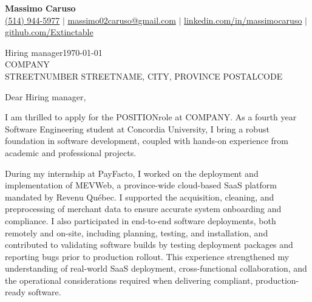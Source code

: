 \documentclass[10pt]{article}
\begin{document}
\newcommand{\fullname}{Massimo Caruso}
\newcommand{\phone}{(514) 944-5977}
\newcommand{\email}{massimo02caruso@gmail.com}
\newcommand{\linkedin}{linkedin.com/in/massimocaruso}
\newcommand{\github}{github.com/Extinctable}

\newcommand*{\hiringManager}{Hiring manager}
\newcommand*{\company}{COMPANY}
\newcommand*{\address}{STREETNUMBER STREETNAME, CITY, PROVINCE POSTALCODE}

\newcommand*{\position}{POSITION}
\newcommand*{\companyDetails}{COMPANYDETAILS}
\newcommand*{\positionDetails}{POSITIONDETAILS}

\begin{center}
    {\Huge \textbf{\fullname}} \\
    \vspace{1mm}
    {\small 
    \faPhone \hspace{0mm} \href{tel:+15149445977}{\phone} $\vert$ 
    \faEnvelope \hspace{0mm} \href{mailto:massimo02caruso@gmail.com}{\email} $\vert$ 
    \faLinkedin \hspace{0mm} \href{https://linkedin.com/in/massimocaruso}{\linkedin} $\vert$ 
    \faGithub \hspace{0mm} \href{https://github.com/Extinctable}{\github}
    }
\end{center}

\vspace{1.5em}
\hiringManager \hfill \today \\
\company \\
\address 


\vspace{1.5em}
Dear \hiringManager,

I am thrilled to apply for the \position \space role at \company. As a fourth year Software Engineering student at Concordia University, I bring a robust foundation in software development, coupled with hands-on experience from academic and professional projects.


During my internship at PayFacto, I worked on the deployment and implementation of MEVWeb, a province-wide cloud-based SaaS platform mandated by Revenu Québec. I supported the acquisition, cleaning, and preprocessing of merchant data to ensure accurate system onboarding and compliance. I also participated in end-to-end software deployments, both remotely and on-site, including planning, testing, and installation, and contributed to validating software builds by testing deployment packages and reporting bugs prior to production rollout. This experience strengthened my understanding of real-world SaaS deployment, cross-functional collaboration, and the operational considerations required when delivering compliant, production-ready software.
\end{document}
